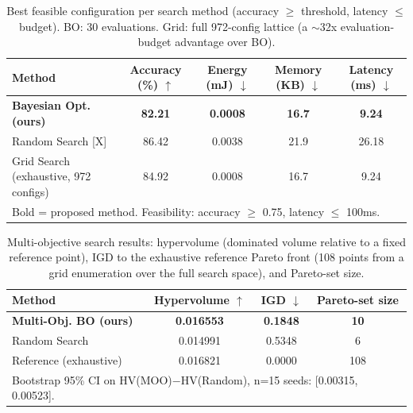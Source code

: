 \begin{table}[t]
\centering
\caption{Best feasible configuration per search method (accuracy $\geq$ threshold, latency $\leq$ budget). BO: 30 evaluations. Grid: full 972-config lattice (a $\sim$32x evaluation-budget advantage over BO).}
\label{tab:main_results}
\begin{tabular}{lcccc}
\toprule
Method & Accuracy (\%) $\uparrow$ & Energy (mJ) $\downarrow$ & Memory (KB) $\downarrow$ & Latency (ms) $\downarrow$ \\
\midrule
\textbf{Bayesian Opt. (ours)} & \textbf{82.21} & \textbf{0.0008} & \textbf{16.7} & \textbf{9.24} \\
Random Search [X] & 86.42 & 0.0038 & 21.9 & 26.18 \\
Grid Search (exhaustive, 972 configs) & 84.92 & 0.0008 & 16.7 & 9.24 \\
\bottomrule
\multicolumn{5}{l}{\footnotesize Bold = proposed method. Feasibility: accuracy $\geq$ 0.75, latency $\leq$ 100ms.} \\
\end{tabular}
\end{table}

\begin{table}[t]
\centering
\caption{Multi-objective search results: hypervolume (dominated volume relative to a fixed reference point), IGD to the exhaustive reference Pareto front (108 points from a grid enumeration over the full search space), and Pareto-set size.}
\label{tab:moo_results}
\begin{tabular}{lccc}
\toprule
Method & Hypervolume $\uparrow$ & IGD $\downarrow$ & Pareto-set size \\
\midrule
\textbf{Multi-Obj. BO (ours)} & \textbf{0.016553} & \textbf{0.1848} & \textbf{10} \\
Random Search & 0.014991 & 0.5348 & 6 \\
Reference (exhaustive) & 0.016821 & 0.0000 & 108 \\
\bottomrule
\multicolumn{4}{l}{\footnotesize Bootstrap 95\% CI on HV(MOO)$-$HV(Random), n=15 seeds: [0.00315, 0.00523].} \\
\end{tabular}
\end{table}